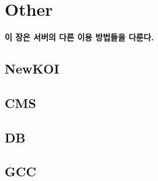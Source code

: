 
\graphicspath{{./chap5/images/}}  
\chapter{Other}

\textbf{이 장은 서버의 다른 이용 방법들을 다룬다.}

\section{NewKOI}
\section{CMS}
\section{DB}
\section{GCC}
